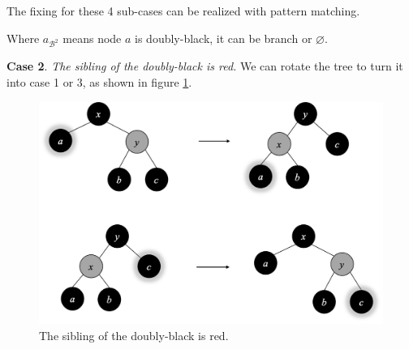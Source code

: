 \documentclass[b5paper]{article}
\begin{document}
The fixing for these 4 sub-cases can be realized with pattern matching.

\be
{}
\label{eq:db-case-1}
\ee

Where $a_{\mathcal{B}^2}$ means node $a$ is doubly-black, it can be branch or $\pmb{\varnothing}$.

\textbf{Case 2}. {\em The sibling of the doubly-black is red.} We can rotate the tree to turn it into case 1 or 3, as shown in figure \ref{fig:del-case2}.

\begin{figure}[htbp]
  \centering
  \includegraphics[scale=0.4]{img/del-case2}
  \caption{The sibling of the doubly-black is red.}
  \label{fig:del-case2}
\end{figure}
\end{document}
